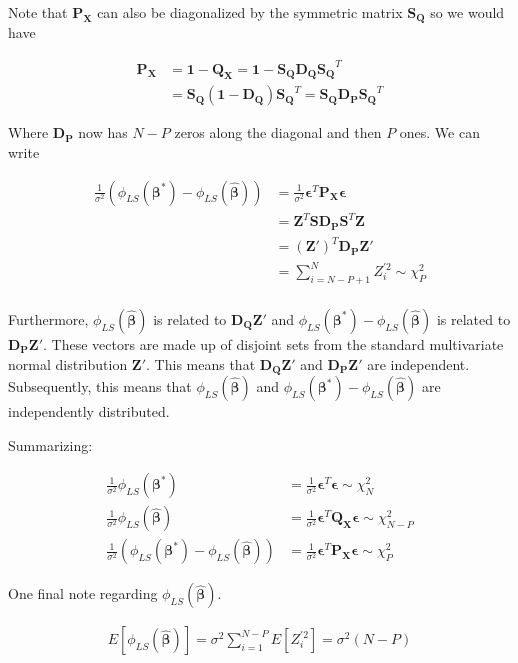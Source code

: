 \documentclass[12pt]{article}
\newcommand{\ep}{\epsilon}
\newcommand{\bv}[1]{\boldsymbol{#1}}
\begin{document}
Note that $\bv{P_X}$ can also be diagonalized by the symmetric matrix $\bv{S_Q}$ so we would have

\begin{align}
\bv{P_X} &= \bv{1} - \bv{Q_X} = \bv{1} - \bv{S_Q}\bv{D_Q}\bv{S_Q}^T\\
&=\bv{S_Q}(\bv{1}-\bv{D_Q})\bv{S_Q}^T = \bv{S_Q}\bv{D_P}\bv{S_Q}^T
\end{align}

Where $\bv{D_P}$ now has $N-P$ zeros along the diagonal and then $P$ ones.
We can write

\begin{align}
\frac{1}{\sigma^2}(\phi_{LS}(\bv{\beta^*}) - \phi_{LS}(\bv{\hat{\beta}})) &= \frac{1}{\sigma^2}\bv{\ep}^T\bv{P_X}\bv{\ep}\\
&= \bv{Z}^T\bv{S}\bv{D_P}\bv{S}^T\bv{Z}\\
&= (\bv{Z}')^T\bv{D_P}\bv{Z}'\\
&= \sum_{i=N-P+1}^N Z_i^{'2} \sim \chi^2_P\\
\end{align}

Furthermore, $\phi_{LS}(\bv{\hat{\beta}})$ is related to $\bv{D_Q}\bv{Z}'$ and $\phi_{LS}(\bv{\beta^*})-\phi_{LS}(\bv{\hat{\beta}})$ is related to $\bv{D_P}\bv{Z'}$. 
These vectors are made up of disjoint sets from the standard multivariate normal distribution $\bv{Z}'$. 
This means that $\bv{D_Q}\bv{Z}'$ and $\bv{D_P}\bv{Z}'$ are independent. 
Subsequently, this means that $\phi_{LS}(\bv{\hat{\beta}})$ and $\phi_{LS}(\bv{\beta^*}) - \phi_{LS}(\bv{\hat{\beta}})$ are independently distributed.

Summarizing:

\begin{align}
\frac{1}{\sigma^2}\phi_{LS}(\bv{\beta^*}) &= \frac{1}{\sigma^2}\bv{\ep}^T\bv{\ep} \sim \chi^2_N\\
\frac{1}{\sigma^2}\phi_{LS}(\bv{\hat{\beta}}) &= \frac{1}{\sigma^2}\bv{\ep}^T\bv{Q_X}\bv{\ep} \sim \chi^2_{N-P}\\
\frac{1}{\sigma^2}(\phi_{LS}(\bv{\beta^*})-\phi_{LS}(\bv{\hat{\beta}})) &= \frac{1}{\sigma^2}\bv{\ep}^T\bv{P_X}\bv{\ep} \sim \chi^2_P
\end{align}

One final note regarding $\phi_{LS}(\bv{\hat{\beta}})$.

\begin{align}
E[\phi_{LS}(\bv{\hat{\beta}})] = \sigma^2 \sum_{i=1}^{N-P} E[Z_i^{'2}] = \sigma^2(N-P)
\end{align}
\end{document}
